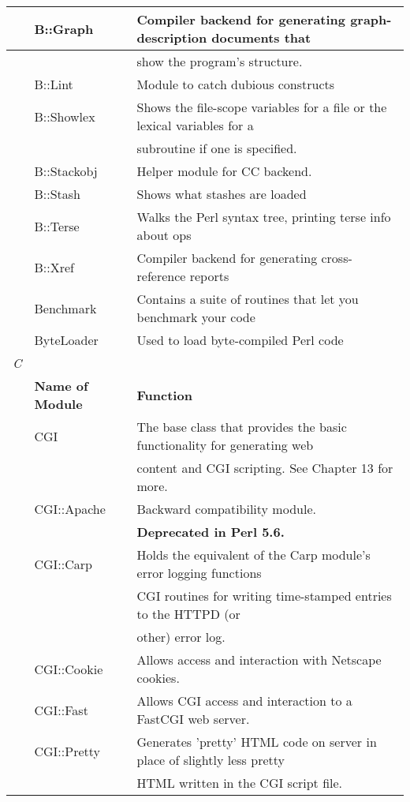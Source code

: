 \documentclass[a4paper,11pt]{book}
\begin{document}
\begin{tabular}{|p{0.2in}|p{1.0in}|p{2.9in}|}
 & B::Graph & Compiler backend for generating graph-description documents that \\ \hline 
 &  & show the program's structure. \\ \hline 
 & B::Lint & Module to catch dubious constructs \\ \hline 
 & B::Showlex & Shows the file-scope variables for a file or the lexical variables for a \\ \hline 
 &  & subroutine if one is specified. \\ \hline 
 & B::Stackobj & Helper module for CC backend. \\ \hline 
 & B::Stash & Shows what stashes are loaded \\ \hline 
 & B::Terse & Walks the Perl syntax tree, printing terse info about ops \\ \hline 
 & B::Xref & Compiler backend for generating cross-reference reports \\ \hline 
 & Benchmark & Contains a suite of routines that let you benchmark your code \\ \hline 
 & ByteLoader & Used to load byte-compiled Perl code \\ \hline 
\newline \textit{C} &  &  \\ \hline 
 & \textbf{Name of Module} & \textbf{Function} \\ \hline 
 & CGI & The base class that provides the basic functionality for generating web \\ \hline 
 &  & content and CGI scripting. See Chapter 13 for more. \\ \hline 
 & CGI::Apache & Backward compatibility module. \\ \hline 
 &  & \textbf{Deprecated in Perl 5.6.} \\ \hline 
 & CGI::Carp & Holds the equivalent of the Carp module's error logging functions \\ \hline 
 &  & CGI routines for writing time-stamped entries to the HTTPD (or \\ \hline 
 &  & other) error log. \\ \hline 
 & CGI::Cookie & Allows access and interaction with Netscape cookies. \\ \hline 
 & CGI::Fast & Allows CGI access and interaction to a FastCGI web server. \\ \hline 
 & CGI::Pretty & Generates 'pretty' HTML code on server in place of slightly less pretty \\ \hline 
 &  & HTML written in the CGI script file. \\ \hline 

\end{tabular}
\end{document}
